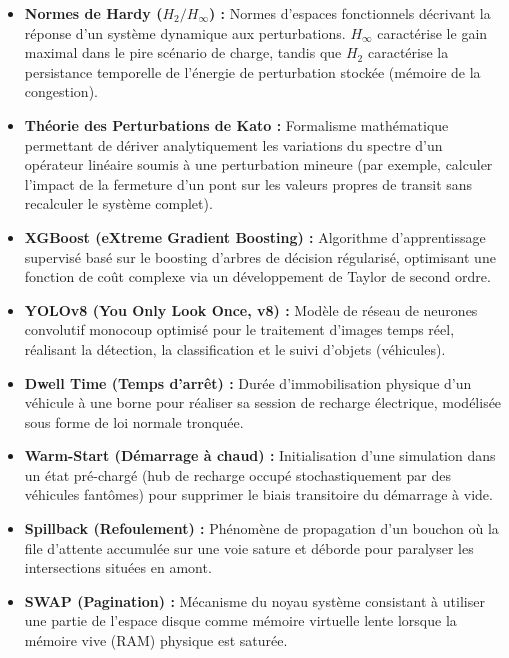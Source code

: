 \documentclass[10pt, a4paper]{article}
\begin{document}
\begin{itemize}
  \textbf{Constante de Kreiss (\(K\)) :} Métrique caractérisant
  l'amplitude maximale de l'amplification transitoire des perturbations
  avant le retour à l'équilibre asymptotique, traduisant la
  vulnérabilité d'un réseau aux embouteillages en cascade.
\item
  \textbf{Normes de Hardy (\(H_2 / H_\infty\)) :} Normes d'espaces
  fonctionnels décrivant la réponse d'un système dynamique aux
  perturbations. \(H_\infty\) caractérise le gain maximal dans le pire
  scénario de charge, tandis que \(H_2\) caractérise la persistance
  temporelle de l'énergie de perturbation stockée (mémoire de la
  congestion).
\item
  \textbf{Théorie des Perturbations de Kato :} Formalisme mathématique
  permettant de dériver analytiquement les variations du spectre d'un
  opérateur linéaire soumis à une perturbation mineure (par exemple,
  calculer l'impact de la fermeture d'un pont sur les valeurs propres de
  transit sans recalculer le système complet).
\item
  \textbf{XGBoost (eXtreme Gradient Boosting) :} Algorithme
  d'apprentissage supervisé basé sur le boosting d'arbres de décision
  régularisé, optimisant une fonction de coût complexe via un
  développement de Taylor de second ordre.
\item
  \textbf{YOLOv8 (You Only Look Once, v8) :} Modèle de réseau de
  neurones convolutif monocoup optimisé pour le traitement d'images
  temps réel, réalisant la détection, la classification et le suivi
  d'objets (véhicules).
\item
  \textbf{Dwell Time (Temps d'arrêt) :} Durée d'immobilisation physique
  d'un véhicule à une borne pour réaliser sa session de recharge
  électrique, modélisée sous forme de loi normale tronquée.
\item
  \textbf{Warm-Start (Démarrage à chaud) :} Initialisation d'une
  simulation dans un état pré-chargé (hub de recharge occupé
  stochastiquement par des véhicules fantômes) pour supprimer le biais
  transitoire du démarrage à vide.
\item
  \textbf{Spillback (Refoulement) :} Phénomène de propagation d'un
  bouchon où la file d'attente accumulée sur une voie sature et déborde
  pour paralyser les intersections situées en amont.
\item
  \textbf{SWAP (Pagination) :} Mécanisme du noyau système consistant à
  utiliser une partie de l'espace disque comme mémoire virtuelle lente
  lorsque la mémoire vive (RAM) physique est saturée.
\end{itemize}
\end{document}
